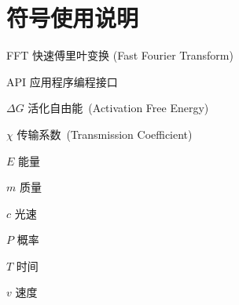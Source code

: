 \chapter*{符号使用说明}

\begin{denotation}

\item[FFT] 快速傅里叶变换 (Fast Fourier Transform)
\item[API] 应用程序编程接口
\item[$\Delta G$]  	活化自由能~(Activation Free Energy)
\item [$\chi$] 传输系数~(Transmission Coefficient)
\item[$E$] 能量
\item[$m$] 质量
\item[$c$] 光速
\item[$P$] 概率
\item[$T$] 时间
\item[$v$] 速度

\end{denotation}
